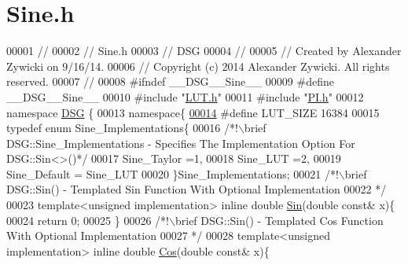 \hypertarget{_sine_8h_source}{\section{Sine.\+h}
\label{_sine_8h_source}
}

\begin{DoxyCode}
00001 \textcolor{comment}{//}
00002 \textcolor{comment}{//  Sine.h}
00003 \textcolor{comment}{//  DSG}
00004 \textcolor{comment}{//}
00005 \textcolor{comment}{//  Created by Alexander Zywicki on 9/16/14.}
00006 \textcolor{comment}{//  Copyright (c) 2014 Alexander Zywicki. All rights reserved.}
00007 \textcolor{comment}{//}
00008 \textcolor{preprocessor}{#ifndef \_\_DSG\_\_Sine\_\_}
00009 \textcolor{preprocessor}{#define \_\_DSG\_\_Sine\_\_}
00010 \textcolor{preprocessor}{#include "\hyperlink{_l_u_t_8h}{LUT.h}"}
00011 \textcolor{preprocessor}{#include "\hyperlink{_p_i_8h}{PI.h}"}
00012 \textcolor{keyword}{namespace }\hyperlink{namespace_d_s_g}{DSG} \{
00013     \textcolor{keyword}{namespace}\{
\hypertarget{_sine_8h_source_l00014}{}\hyperlink{_sine_8h_aebfcb45923a56e8581fda080243ec5bb}{00014} \textcolor{preprocessor}{            #define LUT\_SIZE 16384}
00015         \textcolor{keyword}{typedef} \textcolor{keyword}{enum} Sine\_Implementations\{\textcolor{comment}{}
00016 \textcolor{comment}{            /*!\(\backslash\)brief DSG::Sine\_Implementations - Specifies The Implementation Option For DSG::Sin<>()*/}
00017             Sine\_Taylor =1,
00018             Sine\_LUT =2,
00019             Sine\_Default = Sine\_LUT
00020         \}Sine\_Implementations;\textcolor{comment}{}
00021 \textcolor{comment}{        /*!\(\backslash\)brief DSG::Sin() - Templated Sin Function With Optional Implementation}
00022 \textcolor{comment}{         */}
00023         \textcolor{keyword}{template}<\textcolor{keywordtype}{unsigned} implementation> \textcolor{keyword}{inline} \textcolor{keywordtype}{double} \hyperlink{namespace_d_s_g_aad63d316081c7d13a551acf346ee2749}{Sin}(\textcolor{keywordtype}{double} \textcolor{keyword}{const}& x)\{
00024             \textcolor{keywordflow}{return} 0;
00025         \}\textcolor{comment}{}
00026 \textcolor{comment}{        /*!\(\backslash\)brief DSG::Sin() - Templated Cos Function With Optional Implementation}
00027 \textcolor{comment}{         */}
00028         \textcolor{keyword}{template}<\textcolor{keywordtype}{unsigned} implementation> \textcolor{keyword}{inline} \textcolor{keywordtype}{double} \hyperlink{namespace_d_s_g_ade303ad15c77f534429305c3cbd90191}{Cos}(\textcolor{keywordtype}{double} \textcolor{keyword}{const}& x)\{

\end{DoxyCode}
